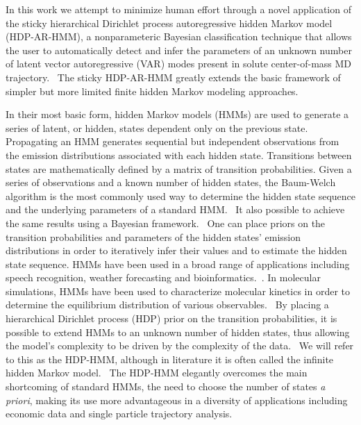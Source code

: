 \documentclass[journal=jpcbfk,manuscript=article]{achemso}
\begin{document}
  In this work we attempt to minimize human effort through a novel application of 
  the sticky hierarchical Dirichlet process autoregressive hidden Markov model 
  (HDP-AR-HMM), a nonparameteric Bayesian classification technique that allows the user to 
  automatically detect and infer the parameters of an unknown number of latent vector
  autoregressive (VAR) modes present in solute center-of-mass MD 
  trajectory.~\cite{fox_bayesian_2010} The sticky HDP-AR-HMM greatly extends the 
  basic framework of simpler but more limited finite hidden Markov modeling approaches.
    
  In their most basic form, hidden Markov models (HMMs) are used to generate
  a series of latent, or hidden, states dependent only on the previous state.~\cite{rabiner_tutorial_1989}
  Propagating an HMM generates sequential but independent observations from 
  the emission distributions associated with each hidden state. Transitions 
  between states are mathematically defined by a matrix of transition probabilities.
  Given a series of observations and a known number of hidden states, the 
  Baum-Welch algorithm is the most commonly used way to determine the hidden
  state sequence and the underlying parameters of a standard HMM.~\cite{baum_maximization_1970}
  It also possible to achieve the same results using a Bayesian 
  framework.~\cite{scott_bayesian_2002,jasra_markov_2005} 
  One can place priors
  on the transition probabilities and parameters of the hidden states' emission
  distributions in order to iteratively infer their values and to estimate the hidden state
  sequence. 
  HMMs have been used in a broad range of applications including speech
  recognition, weather forecasting and bioinformatics.~\cite{juang_hidden_1984,hughes_non-homogeneous_1999,yoon_hidden_2009}.
  In molecular simulations, HMMs have been
  used to characterize molecular kinetics in order to determine the equilibrium 
  distribution of various observables.~\cite{noe_probability_2008}
  By placing a hierarchical Dirichlet process (HDP) prior on the transition 
  probabilities, it is possible to extend HMMs to an unknown number of hidden
  states, thus allowing the model's complexity to be driven by the complexity
  of the data.~\cite{teh_hierarchical_2006} We will refer to this as the HDP-HMM,
  although in literature it is often called the infinite hidden Markov 
  model.~\cite{beal_infinite_2002} The HDP-HMM elegantly overcomes the main
  shortcoming of standard HMMs, the need to choose the number of states 
  \textit{a priori}, making its use more advantageous in a diversity of 
  applications including economic data and single particle trajectory 
  analysis.~\cite{shi_identifying_2016,hines_analyzing_2015} 
\end{document}
